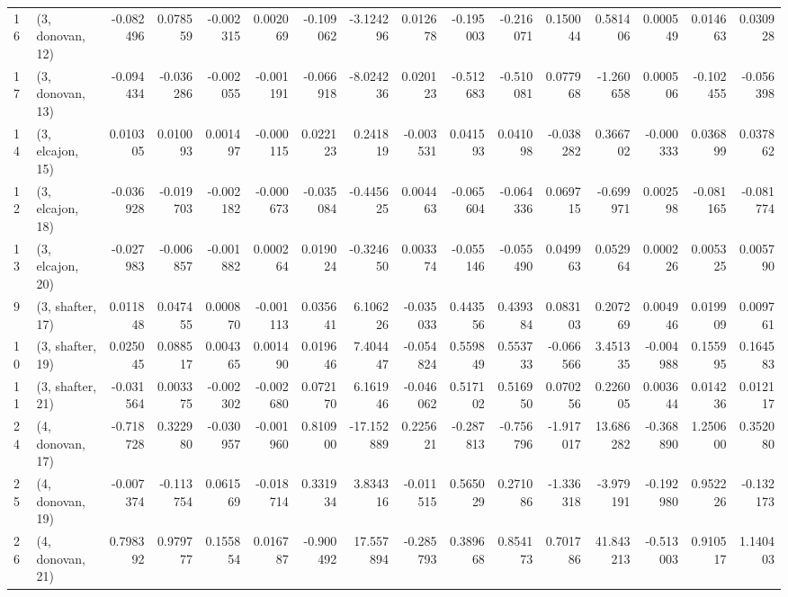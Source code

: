 \begin{tabular}{llrrrrrrrrrrrrrr}
16 &  (3, donovan, 12) & -0.082496 &  0.078559 &  -0.002315 &  0.002069 & -0.109062 &  -3.124296 &  0.012678 &  -0.195003 & -0.216071 &  0.150044 &   0.581406 &  0.000549 &  0.014663 &  0.030928 \\
17 &  (3, donovan, 13) & -0.094434 & -0.036286 &  -0.002055 & -0.001191 & -0.066918 &  -8.024236 &  0.020123 &  -0.512683 & -0.510081 &  0.077968 &  -1.260658 &  0.000506 & -0.102455 & -0.056398 \\
14 &  (3, elcajon, 15) &  0.010305 &  0.010093 &   0.001497 & -0.000115 &  0.022123 &   0.241819 & -0.003531 &   0.041593 &  0.041098 & -0.038282 &   0.366702 & -0.000333 &  0.036899 &  0.037862 \\
12 &  (3, elcajon, 18) & -0.036928 & -0.019703 &  -0.002182 & -0.000673 & -0.035084 &  -0.445625 &  0.004463 &  -0.065604 & -0.064336 &  0.069715 &  -0.699971 &  0.002598 & -0.081165 & -0.081774 \\
13 &  (3, elcajon, 20) & -0.027983 & -0.006857 &  -0.001882 &  0.000264 &  0.019024 &  -0.324650 &  0.003374 &  -0.055146 & -0.055490 &  0.049963 &   0.052964 &  0.000226 &  0.005325 &  0.005790 \\
9  &  (3, shafter, 17) &  0.011848 &  0.047455 &   0.000870 & -0.001113 &  0.035641 &   6.106226 & -0.035033 &   0.443556 &  0.439384 &  0.083103 &   0.207269 &  0.004946 &  0.019909 &  0.009761 \\
10 &  (3, shafter, 19) &  0.025045 &  0.088517 &   0.004365 &  0.001490 &  0.019646 &   7.404447 & -0.054824 &   0.559849 &  0.553733 & -0.066566 &   3.451335 & -0.004988 &  0.155995 &  0.164583 \\
11 &  (3, shafter, 21) & -0.031564 &  0.003375 &  -0.002302 & -0.002680 &  0.072170 &   6.161946 & -0.046062 &   0.517102 &  0.516950 &  0.070256 &   0.226005 &  0.003644 &  0.014236 &  0.012117 \\
24 &  (4, donovan, 17) & -0.718728 &  0.322980 &  -0.030957 & -0.001960 &  0.810900 & -17.152889 &  0.225621 &  -0.287813 & -0.756796 & -1.917017 &  13.686282 & -0.368890 &  1.250600 &  0.352080 \\
25 &  (4, donovan, 19) & -0.007374 & -0.113754 &   0.061569 & -0.018714 &  0.331934 &   3.834316 & -0.011515 &   0.565029 &  0.271086 & -1.336318 &  -3.979191 & -0.192980 &  0.952226 & -0.132173 \\
26 &  (4, donovan, 21) &  0.798392 &  0.979777 &   0.155854 &  0.016787 & -0.900492 &  17.557894 & -0.285793 &   0.389668 &  0.854173 &  0.701786 &  41.843213 & -0.513003 &  0.910517 &  1.140403 \\

\end{tabular}
